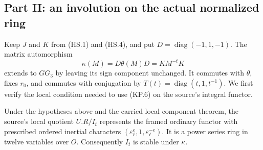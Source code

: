 \subsection{Part II: an involution on the actual normalized ring}

Keep $J$ and $K$ from (HS.1) and (HS.4), and put
$D=\operatorname{diag}(-1,1,-1)$.  The matrix automorphism
\[
 \kappa(M)=D\theta(M)D=K M^{-t}K                             \tag{KP.6}
\]
extends to $GG_3$ by leaving its sign component unchanged.
It commutes with $\theta$, fixes $r_0$, and commutes with
conjugation by $T(t)=\operatorname{diag}(t,1,t^{-1})$.
We first verify the local condition needed to use (KP.6) on
the source's integral functor.

\begin{lemma}
Under the hypotheses above and the carried local component
theorem, the source's local quotient $U.R/I_t$ represents the
framed ordinary functor with prescribed ordered inertial
characters $(\varepsilon_\ell^e,1,\varepsilon_\ell^{-e})$.
It is a power series ring in twelve variables over $O$.
Consequently $I_t$ is stable under $\kappa$.
\end{lemma}
